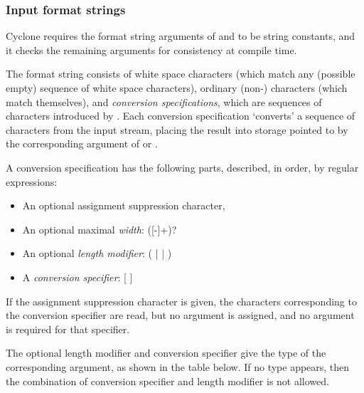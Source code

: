 \subsubsection*{Input format strings}

Cyclone requires the format string arguments of  and
 to be string constants, and it checks the remaining
arguments for consistency at compile time.

The format string consists of white space characters (which match any
(possible empty) sequence of white space characters), ordinary
(non-\code{\%}) characters (which match themselves), and \emph{conversion
specifications}, which are sequences of characters introduced by
\code{\%}.  Each conversion specification `converts' a sequence of
characters from the input stream, placing the result into storage
pointed to by the corresponding argument of  or
.

A conversion specification has the following parts, described, in order,
by regular expressions:
\begin{itemize}
\item An optional assignment suppression character, \code{*}
\item An optional maximal \emph{width}:
([-]+)?
\item An optional \emph{length modifier}:
( |  |  )
\item A \emph{conversion specifier}:
[               \code{\%}]
\end{itemize}

If the assignment suppression character \code{*} is given, the
characters corresponding to the conversion specifier are read, but no
argument is assigned, and no argument is required for that specifier.

The optional length modifier and conversion specifier give the type of
the corresponding argument, as shown in the table below.  If no type
appears, then the combination of conversion specifier and length
modifier is not allowed.

